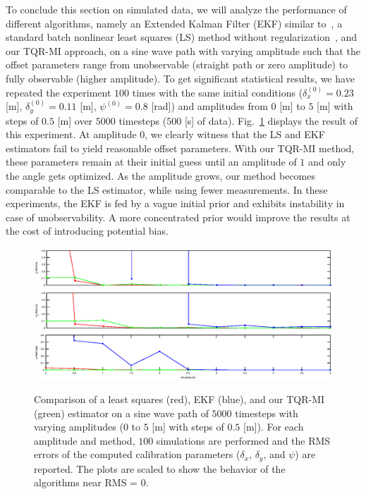 To conclude this section on simulated data, we will analyze the performance of
different algorithms, namely an Extended Kalman Filter (EKF) similar
to~\cite{martinelli06automatic}, a standard batch nonlinear least squares (LS)
method without regularization~\cite{kuemmerle11simultaneous}, and our TQR-MI
approach, on a sine wave path with varying amplitude such that the offset
parameters range from unobservable (straight path or zero amplitude) to
fully observable (higher amplitude). To get significant statistical results, we
have repeated the experiment $100$ times with the same initial conditions
($\delta_x^{(0)}=0.23$ [m], $\delta_y^{(0)}=0.11$ [m], $\psi^{(0)}=0.8$ [rad])
and amplitudes from $0$ [m] to $5$ [m] with steps of $0.5$ [m] over $5000$
timesteps ($500$ [s] of data). Fig.~\ref{fig:sine-wave-analysis} displays the
result of this experiment. At amplitude $0$, we clearly witness that the LS and
EKF estimators fail to yield reasonable offset parameters. With our TQR-MI
method, these parameters remain at their initial guess until an amplitude of $1$
and only the angle gets optimized. As the amplitude grows, our method becomes
comparable to the LS estimator, while using fewer measurements. In these
experiments, the EKF is fed by a vague initial prior and exhibits instability
in case of unobservability. A more concentrated prior would improve the results
at the cost of introducing potential bias.

\begin{figure}[t]
\begin{center}
\includegraphics[]{fig/sine-wave-dx-rms.eps}\\
\includegraphics[]{fig/sine-wave-dy-rms.eps}\\
\hspace*{0.05in}\includegraphics[]{fig/sine-wave-psi-rms.eps}
\caption{Comparison of a least squares (red), EKF (blue), and our TQR-MI (green)
  estimator on a sine wave path of $5000$ timesteps with varying amplitudes
  ($0$ to $5$ [m] with steps of $0.5$ [m]). For each amplitude and method, $100$
  simulations are performed and the RMS errors of the computed calibration
  parameters ($\delta_x$, $\delta_y$, and $\psi$) are reported. The plots are
  scaled to show the behavior of the algorithms near RMS = 0.}
\label{fig:sine-wave-analysis}
\end{center}
\end{figure}

